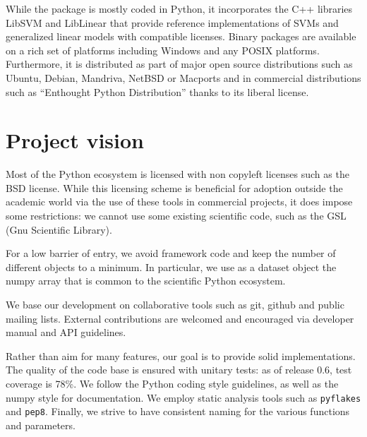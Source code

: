 \documentclass[twoside,11pt]{article}
\begin{document}
While the package is mostly coded in Python, it incorporates the C++
libraries LibSVM \citep{chang2001} and LibLinear \citep{fan2008} that
provide reference implementations of SVMs and generalized linear models
with compatible licenses.
%
Binary packages are available on a rich set of platforms including
Windows and any POSIX platforms. Furthermore, it is distributed as part
of major open source distributions such as Ubuntu, Debian, Mandriva,
NetBSD or Macports and in commercial distributions such as ``Enthought
Python Distribution'' thanks to its liberal license.




\section {Project vision}

%
Most of the Python ecosystem is licensed with non copyleft licenses such
as the BSD license. While this licensing scheme is beneficial for adoption
outside the academic world via the use of these tools in commercial
projects, it does impose some restrictions: we cannot use some existing
scientific code, such as the GSL (Gnu Scientific Library).

\smallskip {}
%
For a low barrier of entry, we avoid framework code and keep the number
of different objects to a minimum. In particular, we use as a dataset
object the numpy array \citep{Vanderwalt2011} that is common to the
scientific Python ecosystem.

\smallskip
{}
%
We base our development on collaborative tools such as git, github and
public mailing lists. External contributions are welcomed and
encouraged via developer manual and API guidelines.

\smallskip {}
%
Rather than aim for many features, our goal is to provide solid
implementations. The quality of the code base is ensured with unitary
tests: as of release 0.6, test coverage is 78\%. We follow the Python
coding style guidelines, as well as the numpy style for documentation. We
employ static analysis tools such as {\tt pyflakes} and {\tt pep8}.
Finally, we strive to have consistent naming for the various functions
and parameters.
\end{document}
